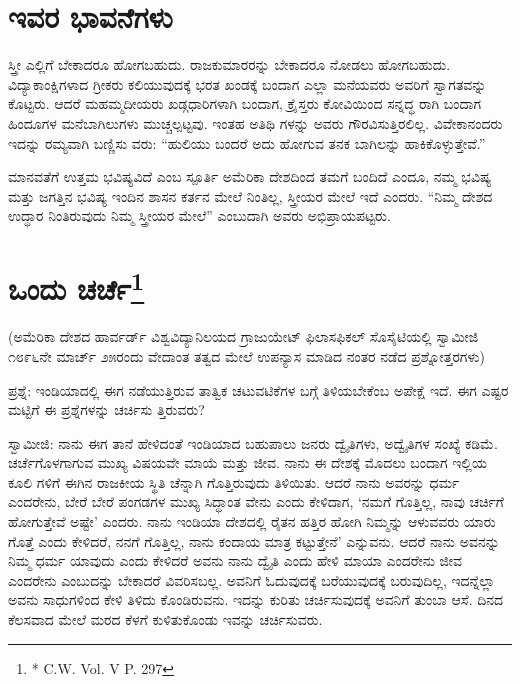 \section{ಇವರ ಭಾವನೆಗಳು}

ಸ್ತ್ರೀ ಎಲ್ಲಿಗೆ ಬೇಕಾದರೂ ಹೋಗಬಹುದು. ರಾಜಕುಮಾರರನ್ನು ಬೇಕಾದರೂ ನೋಡಲು ಹೋಗಬಹುದು. ವಿದ್ಯಾಕಾಂಕ್ಷಿಗಳಾದ ಗ್ರೀಕರು ಕಲಿಯುವುದಕ್ಕೆ ಭರತ ಖಂಡಕ್ಕೆ ಬಂದಾಗ ಎಲ್ಲಾ ಮನೆಯವರು ಅವರಿಗೆ ಸ್ವಾಗತವನ್ನು ಕೊಟ್ಟರು. ಆದರೆ ಮಹಮ್ಮದೀಯರು ಖಡ್ಗಧಾರಿಗಳಾಗಿ ಬಂದಾಗ, ಕ್ರೈಸ್ತರು ಕೋವಿಯಿಂದ ಸನ್ನದ್ಧ ರಾಗಿ ಬಂದಾಗ ಹಿಂದೂಗಳ ಮನೆಬಾಗಿಲುಗಳು ಮುಚ್ಚಲ್ಪಟ್ಟವು. ಇಂತಹ ಅತಿಥಿ ಗಳನ್ನು ಅವರು ಗೌರವಿಸುತ್ತಿರಲಿಲ್ಲ. ವಿವೇಕಾನಂದರು ಇದನ್ನು ರಮ್ಯವಾಗಿ ಬಣ್ಣಿಸು ವರು: “ಹುಲಿಯು ಬಂದರೆ ಅದು ಹೋಗುವ ತನಕ ಬಾಗಿಲನ್ನು ಹಾಕಿಕೊಳ್ಳುತ್ತೇವೆ.”

ಮಾನವತೆಗೆ ಉತ್ತಮ ಭವಿಷ್ಯವಿದೆ ಎಂಬ ಸ್ಪೂರ್ತಿ ಅಮೆರಿಕಾ ದೇಶದಿಂದ ತಮಗೆ ಬಂದಿದೆ ಎಂದೂ, ನಮ್ಮ ಭವಿಷ್ಯ ಮತ್ತು ಜಗತ್ತಿನ ಭವಿಷ್ಯ ಇಂದಿನ ಶಾಸನ ಕರ್ತನ ಮೇಲೆ ನಿಂತಿಲ್ಲ, ಸ್ತ್ರೀಯರ ಮೇಲೆ ಇದೆ ಎಂದರು. “ನಿಮ್ಮ ದೇಶದ ಉದ್ಧಾರ ನಿಂತಿರುವುದು ನಿಮ್ಮ ಸ್ತ್ರೀಯರ ಮೇಲೆ” ಎಂಬುದಾಗಿ ಅವರು ಅಭಿಪ್ರಾಯಪಟ್ಟರು.


\section{ಒಂದು ಚರ್ಚೆ\protect\footnote{* C.W. Vol. V P. 297}}

\begin{center}
(ಅಮೆರಿಕಾ ದೇಶದ ಹಾರ್ವರ್ಡ್​ ವಿಶ್ವವಿದ್ಯಾನಿಲಯದ ಗ್ರಾಜುಯೇಟ್​ ಫಿಲಾಸಫಿಕಲ್​ ಸೊಸೈಟಿಯಲ್ಲಿ ಸ್ವಾಮೀಜಿ ೧೮೯೬ನೇ ಮಾರ್ಚ್​ ೨೫ರಂದು ವೇದಾಂತ ತತ್ವದ ಮೇಲೆ ಉಪನ್ಯಾಸ ಮಾಡಿದ ನಂತರ ನಡೆದ ಪ್ರಶ್ನೋತ್ತರಗಳು)
\end{center}

ಪ್ರಶ್ನೆ: ಇಂಡಿಯಾದಲ್ಲಿ ಈಗ ನಡೆಯುತ್ತಿರುವ ತಾತ್ವಿಕ ಚಟುವಟಿಕೆಗಳ ಬಗ್ಗೆ ತಿಳಿಯಬೇಕೆಂಬ ಅಪೇಕ್ಷೆ ಇದೆ. ಈಗ ಎಷ್ಟರ ಮಟ್ಟಿಗೆ ಈ ಪ್ರಶ್ನೆಗಳನ್ನು ಚರ್ಚಿಸು ತ್ತಿರುವರು?

ಸ್ವಾಮೀಜಿ: ನಾನು ಈಗ ತಾನೆ ಹೇಳಿದಂತೆ ಇಂಡಿಯಾದ ಬಹುಪಾಲು ಜನರು ದ್ವೈತಿಗಳು, ಅದ್ವೈತಿಗಳ ಸಂಖ್ಯೆ ಕಡಿಮೆ. ಚರ್ಚೆಗೊಳಗಾಗುವ ಮುಖ್ಯ ವಿಷಯವೇ ಮಾಯೆ ಮತ್ತು ಜೀವ. ನಾನು ಈ ದೇಶಕ್ಕೆ ಮೊದಲು ಬಂದಾಗ ಇಲ್ಲಿಯ ಕೂಲಿ ಗಳಿಗೆ ಈಗಿನ ರಾಜಕೀಯ ಸ್ಥಿತಿ ಚೆನ್ನಾಗಿ ಗೊತ್ತಿರುವುದು ತಿಳಿಯಿತು. ಆದರೆ ನಾನು ಅವರನ್ನು ಧರ್ಮ ಎಂದರೇನು, ಬೇರೆ ಬೇರೆ ಪಂಗಡಗಳ ಮುಖ್ಯ ಸಿದ್ಧಾಂತ ವೇನು ಎಂದು ಕೇಳಿದಾಗ, ‘ನಮಗೆ ಗೊತ್ತಿಲ್ಲ, ನಾವು ಚರ್ಚಿಗೆ ಹೋಗುತ್ತೇವೆ ಅಷ್ಟೇ’ ಎಂದರು. ನಾನು ಇಂಡಿಯಾ ದೇಶದಲ್ಲಿ ರೈತನ ಹತ್ತಿರ ಹೋಗಿ ನಿಮ್ಮನ್ನು ಆಳುವವರು ಯಾರು ಗೊತ್ತೆ ಎಂದು ಕೇಳಿದರೆ, ನನಗೆ ಗೊತ್ತಿಲ್ಲ, ನಾನು ಕಂದಾಯ ಮಾತ್ರ ಕಟ್ಟುತ್ತೇನೆ’ ಎನ್ನುವನು. ಆದರೆ ನಾನು ಅವನನ್ನು ನಿಮ್ಮ ಧರ್ಮ ಯಾವುದು ಎಂದು ಕೇಳಿದರೆ ಅವನು ನಾನು ದ್ವೈತಿ ಎಂದು ಹೇಳಿ ಮಾಯಾ ಎಂದರೇನು ಜೀವ ಎಂದರೇನು ಎಂಬುದನ್ನು ಬೇಕಾದರೆ ವಿವರಿಸಬಲ್ಲ. ಅವನಿಗೆ ಓದುವುದಕ್ಕೆ ಬರೆಯುವುದಕ್ಕೆ ಬರುವುದಿಲ್ಲ, ಇದನ್ನೆಲ್ಲಾ ಅವನು ಸಾಧುಗಳಿಂದ ಕೇಳಿ ತಿಳಿದು ಕೊಂಡಿರುವನು. ಇದನ್ನು ಕುರಿತು ಚರ್ಚಿಸುವುದಕ್ಕೆ ಅವನಿಗೆ ತುಂಬಾ ಆಸೆ. ದಿನದ ಕೆಲಸವಾದ ಮೇಲೆ ಮರದ ಕೆಳಗೆ ಕುಳಿತುಕೊಂಡು ಇವನ್ನು ಚರ್ಚಿಸುವರು.

